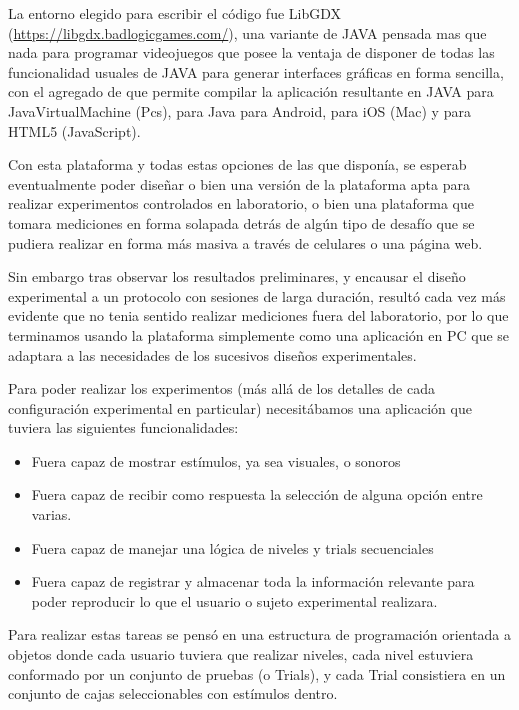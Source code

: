 \documentclass{article}
\begin{document}
    La entorno elegido para escribir el código fue LibGDX (\url{https://libgdx.badlogicgames.com/}), una variante de JAVA pensada mas que nada para programar videojuegos que posee la ventaja de disponer de todas las funcionalidad usuales de JAVA para generar interfaces gráficas en forma sencilla, con el agregado de que permite compilar la aplicación resultante en JAVA para JavaVirtualMachine (Pcs), para Java para Android, para iOS (Mac) y para HTML5 (JavaScript). 
    
    Con esta plataforma y todas estas opciones de las que disponía, se esperab eventualmente poder diseñar o bien una versión de la plataforma apta para realizar experimentos controlados en laboratorio, o bien una plataforma que tomara mediciones en forma solapada detrás de algún tipo de desafío que se pudiera realizar en forma más masiva a través de celulares o una página web. 
    
    Sin embargo tras observar los resultados preliminares, y encausar el diseño experimental a un protocolo con sesiones de larga duración, resultó cada vez más evidente que no tenia sentido realizar mediciones fuera del laboratorio, por lo que terminamos usando la plataforma simplemente como una aplicación en PC que se adaptara a las necesidades de los sucesivos diseños experimentales. 
    
    Para poder realizar los experimentos (más allá de los detalles de cada configuración experimental en particular) necesitábamos una aplicación que tuviera las siguientes funcionalidades:
    
    \begin{itemize}
        \item Fuera capaz de mostrar estímulos, ya sea visuales, o sonoros
        \item Fuera capaz de recibir como respuesta la selección de alguna opción entre varias.
        \item Fuera capaz de manejar una lógica de niveles y trials secuenciales
        \item Fuera capaz de registrar y almacenar toda la información relevante para poder reproducir lo que el usuario o sujeto experimental realizara. 
    \end{itemize}
    
    Para realizar estas tareas se pensó en una estructura de programación orientada a objetos donde cada usuario tuviera que realizar niveles, cada nivel estuviera conformado por un conjunto de pruebas (o Trials), y cada Trial consistiera en un conjunto de cajas seleccionables con estímulos dentro. 
    
\end{document}
